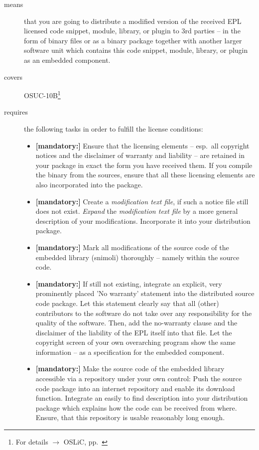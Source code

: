 \begin{description}
\item[means] that you are going to distribute a modified version of the received
EPL licensed code snippet, module, library, or plugin to 3rd parties -- in the
form of binary files or as a binary package together with another larger
software unit which contains this code snippet, module, library, or plugin as an
embedded component.
\item[covers] OSUC-10B\footnote{For details $\rightarrow$ OSLiC, pp.\
\pageref{OSUC-10B-DEF}}
\item[requires] the following tasks in order to fulfill the license conditions:
\begin{itemize}

  \item \textbf{[mandatory:]} Ensure that the licensing elements -- esp.\ all
  copyright notices and the disclaimer of warranty and liability -- are retained
  in your package in exact the form you have received them. If you compile the
  binary from the sources, ensure that all these licensing elements are also
  incorporated into the package.
  
  \item \textbf{[mandatory:]} Create a \emph{modification text file}, if such a
  notice file still does not exist. \emph{Expand} the \emph{modification text
  file} by a more general description of your modifications. Incorporate it into
  your distribution package.

  \item \textbf{[mandatory:]} Mark all modifications of the source code of the
  embedded library (snimoli) thoroughly -- namely within the source code.

  \item \textbf{[mandatory:]} If still not existing, integrate an explicit, very
  prominently placed 'No warranty' statement into the distributed source code
  package. Let this statement clearly say that all (other) contributors to the
  software do not take over any responsibility for the quality of the software.
  Then, add the no-warranty clause and the disclaimer of the liability of the
  EPL itself into that file. Let the copyright screen of your own overarching
  program show the same information  -- as a specification for the embedded
  component.
  
  \item \textbf{[mandatory:]} Make the source code of the embedded library
  accessible via a repository under your own control: Push the source code
  package into an internet repository and enable its download function.
  Integrate an easily to find description into your distribution package which
  explains how the code can be received from where. Ensure, that this repository
  is usable reasonably long enough.
  

\end{itemize}
\end{description}
